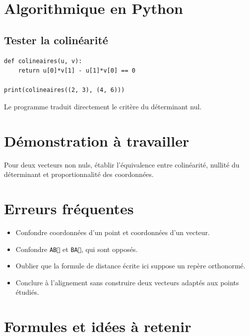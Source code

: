 
\section{Algorithmique en Python}

\subsection{Tester la colinéarité}

\begin{verbatim}
def colineaires(u, v):
    return u[0]*v[1] - u[1]*v[0] == 0

print(colineaires((2, 3), (4, 6)))
\end{verbatim}

Le programme traduit directement le critère du déterminant nul.

\section{Démonstration à travailler}

Pour deux vecteurs non nuls, établir l'équivalence entre colinéarité, nullité du déterminant et proportionnalité des coordonnées.

\section{Erreurs fréquentes}

\begin{itemize}
\item Confondre coordonnées d'un point et coordonnées d'un vecteur.
\item Confondre \texttt{AB⃗} et \texttt{BA⃗}, qui sont opposés.
\item Oublier que la formule de distance écrite ici suppose un repère orthonormé.
\item Conclure à l'alignement sans construire deux vecteurs adaptés aux points étudiés.
\end{itemize}

\section{Formules et idées à retenir}


